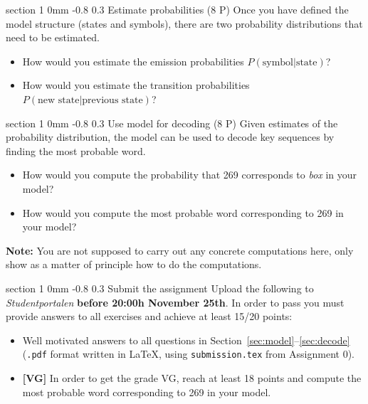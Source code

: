 \documentclass[11pt]{article}
\makeatletter
\newcommand{\newsec}[2]{\section{#1}\label{sec:#2}\noindent}
\renewcommand{\section}{\@startsection
{section}%
{1}%
{0mm}%
{-0.8\baselineskip}%
{0.3\baselineskip}%
{\bfseries\large}}%
\makeatother
\begin{document}
\newsec{Estimate probabilities (8 P)}{estimate}%
Once you have defined the model structure (states and symbols), there are two probability distributions that need to be estimated.
\begin{itemize}[noitemsep,topsep=0.2cm]
\item How would you estimate the emission probabilities $P(\mbox{symbol}|\mbox{state})$?
\item How would you estimate the transition probabilities $P(\mbox{new state}|\mbox{previous state})$?
\end{itemize}

\newsec{Use model for decoding (8 P)}{decode}%
Given estimates of the probability distribution, the model can be used
to decode key sequences by finding the most probable word.
\begin{itemize}[noitemsep,topsep=0.2cm]
\item How would you compute the probability that 269 corresponds to
  {\em box} in your model?
\item How would you compute the most probable word corresponding to
  269 in your model?
\end{itemize}
\textbf{Note:} You are not supposed to carry out any concrete
computations here, only show as a matter of principle how to do the
computations.

\newsec{Submit the assignment}{submit}%
Upload the following to {\it Studentportalen} \textbf{before 20:00h
  November 25th}. In order to pass you must provide answers to all
exercises and achieve at least 15/20 points:
\begin{itemize}[noitemsep,topsep=0.2cm]
\item Well motivated answers to all questions in
  Section~\ref{sec:model}--\ref{sec:decode} (\texttt{.pdf} format
  written in \LaTeX, using \texttt{submission.tex} from Assignment 0).
\item \textbf{[VG]} In order to get the grade VG, reach at least 18
  points and compute the most probable word corresponding to 269 in
  your model.
\end{itemize}
\end{document}
